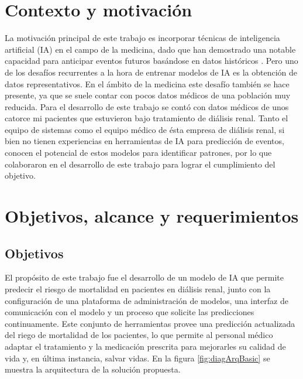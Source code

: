 \section{Contexto y motivación}

La motivación principal de este trabajo es incorporar técnicas de inteligencia artificial (IA) en el campo de la medicina, dado que han demostrado una notable capacidad para anticipar eventos futuros basándose en datos históricos \citep{ARTICULO2}. 
Pero uno de los desafíos recurrentes a la hora de entrenar modelos de IA es la obtención de datos representativos. En el ámbito de la medicina este desafío también se hace presente, ya que se suele contar con pocos datos médicos de una población muy reducida.
Para el desarrollo de este trabajo se contó con datos médicos de unos catorce mi pacientes que estuvieron bajo tratamiento de diálisis renal. 
Tanto el equipo de sistemas como el equipo médico de ésta empresa de diálisis renal, si bien no tienen experiencias en herramientas de IA para predicción de eventos, conocen el potencial de estos modelos para identificar patrones, por lo que colaboraron en el desarrollo de este trabajo para lograr el cumplimiento del objetivo.


\section{Objetivos, alcance y requerimientos}

\subsection{Objetivos}

El propósito de este trabajo fue el desarrollo de un modelo de IA que permite predecir el riesgo de mortalidad en pacientes en diálisis renal, junto con la configuración de una plataforma de administración de modelos, una interfaz de comunicación con el modelo y un proceso que solicite las predicciones continuamente. Este conjunto de herramientas provee una predicción actualizada del riego de mortalidad de los pacientes, lo que permite al personal médico adaptar el tratamiento y la medicación prescrita para mejorarles su calidad de vida y, en última instancia, salvar vidas. En la figura \ref{fig:diagArqBasic} se muestra la arquitectura de la solución propuesta. 

